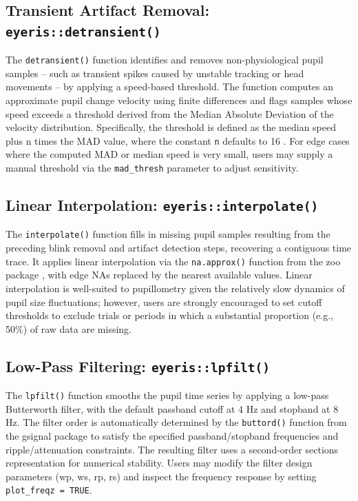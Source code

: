 \subsection{Transient Artifact Removal: \texttt{eyeris::detransient()}}
The \texttt{detransient()} function identifies and removes non-physiological pupil samples – such as transient spikes caused by unstable tracking or head movements – by applying a speed-based threshold. The function computes an approximate pupil change velocity using finite differences and flags samples whose speed exceeds a threshold derived from the Median Absolute Deviation \parencite[MAD;][]{arachchige2024confidence,hampel1968contributions,hampel1974influence,leys2013detecting,rousseeuw1993alternatives,rousseeuw1986robust} of the velocity distribution. Specifically, the threshold is defined as the median speed plus n times the MAD value, where the constant \texttt{n} defaults to 16 \parencite{tsukahara2020pupillometry}. For edge cases where the computed MAD or median speed is very small, users may supply a manual threshold via the \texttt{mad\_thresh} parameter to adjust sensitivity.

\subsection{Linear Interpolation: \texttt{eyeris::interpolate()}}
The \texttt{interpolate()} function fills in missing pupil samples resulting from the preceding blink removal and artifact detection steps, recovering a contiguous time trace. It applies linear interpolation via the \texttt{na.approx()} function from the zoo package \parencite{zeileis2005zoo}, with edge NAs replaced by the nearest available values. Linear interpolation is well-suited to pupillometry given the relatively slow dynamics of pupil size fluctuations; however, users are strongly encouraged to set cutoff thresholds to exclude trials or periods in which a substantial proportion (e.g., 50\%) of raw data are missing.

\subsection{Low-Pass Filtering: \texttt{eyeris::lpfilt()}}
The \texttt{lpfilt()} function smooths the pupil time series by applying a low-pass Butterworth filter, with the default passband cutoff at 4 Hz and stopband at 8 Hz. The filter order is automatically determined by the \texttt{buttord()} function from the gsignal package \parencite{vanboxtel2021gsignal} to satisfy the specified passband/stopband frequencies and ripple/attenuation constraints. The resulting filter uses a second-order sections representation for numerical stability. Users may modify the filter design parameters (wp, ws, rp, rs) and inspect the frequency response by setting \texttt{plot\_freqz = TRUE}.

